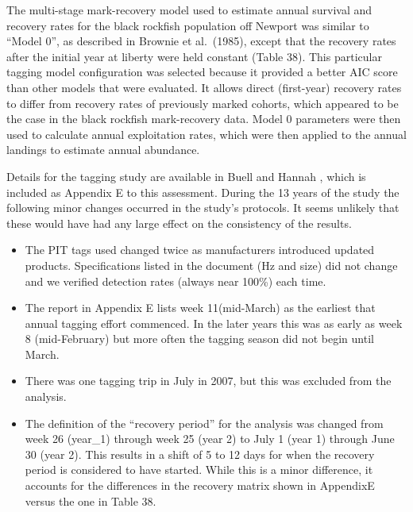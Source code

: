 \documentclass[11pt,
  english,
  letterpaper,
]{article}
\providecommand{\tightlist}{%
  \setlength{\itemsep}{0pt}\setlength{\parskip}{0pt}}
\providecommand{\tightlist}{%
  \setlength{\itemsep}{0pt}\setlength{\parskip}{0pt}}
\begin{document}
The multi-stage mark-recovery model used to estimate annual survival and recovery rates for the black rockfish population off Newport was similar to ``Model 0'', as described in Brownie et al.~(1985), except that the recovery rates after the initial year at liberty were held constant (Table 38). This particular tagging model configuration was selected because it provided a better AIC score than other models that were evaluated. It allows direct (first-year) recovery rates to differ from recovery rates of previously marked cohorts, which appeared to be the case in the black rockfish mark-recovery data. Model 0 parameters were then used to calculate annual exploitation rates, which were then applied to the annual landings to estimate annual abundance.

Details for the tagging study are available in Buell and Hannah , which is included as Appendix E to this assessment. During the 13 years of the study the following minor changes occurred in the study's protocols. It seems unlikely that these would have had any large effect on the consistency of the results.

\begin{itemize}
\tightlist
\item
  The PIT tags used changed twice as manufacturers introduced updated products. Specifications listed in the document (Hz and size) did not change and we verified detection rates (always near 100\%) each time.
\item
  The report in Appendix E lists week 11(mid-March) as the earliest that annual tagging effort commenced. In the later years this was as early as week 8 (mid-February) but more often the tagging season did not begin until March.
\item
  There was one tagging trip in July in 2007, but this was excluded from the analysis.
\item
  The definition of the ``recovery period'' for the analysis was changed from week 26 (year\_1) through week 25 (year 2) to July 1 (year 1) through June 30 (year 2). This results in a shift of 5 to 12 days for when the recovery period is considered to have started. While this is a minor difference, it accounts for the differences in the recovery matrix shown in AppendixE versus the one in Table 38.
\end{itemize}
\end{document}
